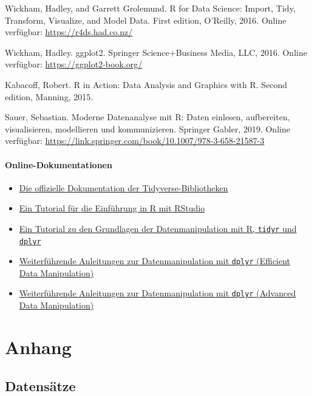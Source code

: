 \documentclass[
]{book}
\providecommand{\tightlist}{%
  \setlength{\itemsep}{0pt}\setlength{\parskip}{0pt}}
\begin{document}
Wickham, Hadley, and Garrett Grolemund. R for Data Science: Import, Tidy, Transform, Visualize, and Model Data. First edition, O'Reilly, 2016. Online verfügbar: \href{https://r4ds.had.co.nz}{https://r4ds.had.co.nz/}

Wickham, Hadley. ggplot2. Springer Science+Business Media, LLC, 2016. Online verfügbar: \href{https://ggplot2-book.org}{https://ggplot2-book.org/}

Kabacoff, Robert. R in Action: Data Analysis and Graphics with R. Second edition, Manning, 2015.

Sauer, Sebastian. Moderne Datenanalyse mit R: Daten einlesen, aufbereiten, visualisieren, modellieren und kommunizieren. Springer Gabler, 2019. Online verfügbar: \url{https://link.springer.com/book/10.1007/978-3-658-21587-3}

\hypertarget{online-dokumentationen}{%
\subsection{Online-Dokumentationen}\label{online-dokumentationen}}

\begin{itemize}
\tightlist
\item
  \href{https://www.tidyverse.org/}{Die offizielle Dokumentation der Tidyverse-Bibliotheken}
\item
  \href{https://ourcodingclub.github.io/tutorials/intro-to-r/}{Ein Tutorial für die Einführung in R mit RStudio}
\item
  \href{https://ourcodingclub.github.io/tutorials/data-manip-intro/}{Ein Tutorial zu den Grundlagen der Datenmanipulation mit R, \texttt{tidyr} und \texttt{dplyr}}
\item
  \href{https://ourcodingclub.github.io/tutorials/data-manip-efficient/}{Weiterführende Anleitungen zur Datenmanipulation mit \texttt{dplyr} (Efficient Data Manipulation)}
\item
  \href{https://ourcodingclub.github.io/tutorials/data-manip-creative-dplyr/}{Weiterführende Anleitungen zur Datenmanipulation mit \texttt{dplyr} (Advanced Data Manipulation)}
\end{itemize}

\hypertarget{part-anhang}{%
\part*{Anhang}\label{part-anhang}}

\hypertarget{datensaetze}{%
\chapter*{Datensätze}\label{datensaetze}}
\end{document}
